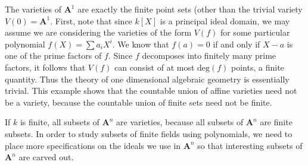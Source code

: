 \begin{example}
    The varieties of $\mathbf{A}^1$ are exactly the finite point sets (other than the trivial variety $V(0) = \mathbf{A}^1$. First, note that since $k[X]$ is a principal ideal domain, we may assume we are considering the varieties of the form $V(f)$ for some particular polynomial $f(X) = \sum a_i X^i$. We know that $f(a) = 0$ if and only if $X - a$ is one of the prime factors of $f$. Since $f$ decomposes into finitely many prime factors, it follows that $V(f)$ can consist of at most $\text{deg}(f)$ points, a finite quantity. Thus the theory of one dimensional algebraic geometry is essentially trivial. This example shows that the countable union of affine varieties need not be a variety, because the countable union of finite sets need not be finite.
\end{example}

\begin{example}
    If $k$ is finite, all subsets of $\mathbf{A}^n$ are varieties, because all subsets of $\mathbf{A}^n$ are finite subsets. In order to study subsets of finite fields using polynomials, we need to place more specifications on the ideals we use in $\mathbf{A}^n$ so that interesting subsets of $\mathbf{A}^n$ are carved out.
\end{example}

